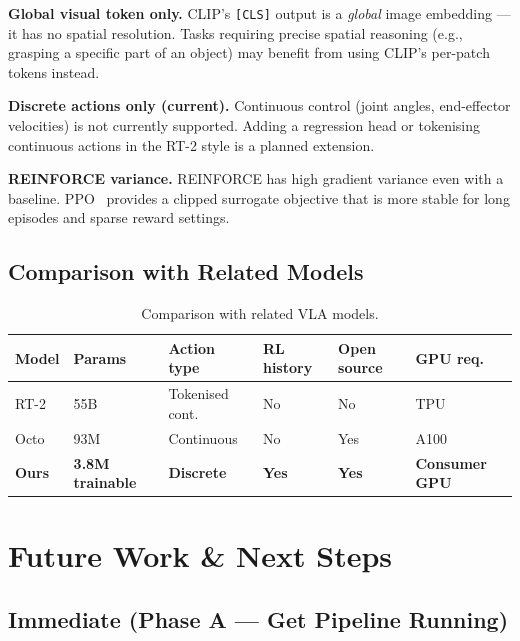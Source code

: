 \documentclass[12pt, a4paper]{article}
\begin{document}
\textbf{Global visual token only.}
CLIP's \texttt{[CLS]} output is a \emph{global} image embedding — it has no
spatial resolution.
Tasks requiring precise spatial reasoning (e.g., grasping a specific part of
an object) may benefit from using CLIP's per-patch tokens instead.

\textbf{Discrete actions only (current).}
Continuous control (joint angles, end-effector velocities) is not currently
supported.
Adding a regression head or tokenising continuous actions in the RT-2 style
is a planned extension.

\textbf{REINFORCE variance.}
REINFORCE has high gradient variance even with a baseline.
PPO~\cite{schulman2017ppo} provides a clipped surrogate objective that
is more stable for long episodes and sparse reward settings.

\subsection{Comparison with Related Models}

\begin{table}[h]
\centering
\caption{Comparison with related VLA models.}
\begin{tabular}{L{3cm} C{2.2cm} C{2cm} C{2cm} C{2.5cm} C{2cm}}
\toprule
\textbf{Model} & \textbf{Params} & \textbf{Action type} & \textbf{RL history} & \textbf{Open source} & \textbf{GPU req.} \\
\midrule
RT-2             & 55B  & Tokenised cont. & No  & No  & TPU \\
Octo             & 93M  & Continuous      & No  & Yes & A100 \\
\textbf{Ours}    & \textbf{3.8M trainable} & \textbf{Discrete} & \textbf{Yes} & \textbf{Yes} & \textbf{Consumer GPU} \\
\bottomrule
\end{tabular}
\end{table}

\newpage

\section{Future Work \& Next Steps}
\label{sec:future}

\subsection{Immediate (Phase A — Get Pipeline Running)}
\end{document}
